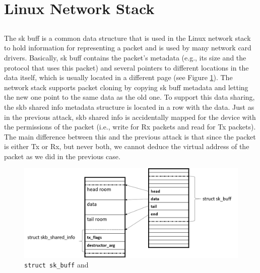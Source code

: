 \section{Linux Network Stack}

\subsection{\shinfo}
The sk buff is a common data structure that is used in the Linux network stack to
hold information for representing a packet and is used by many network card drivers.
Basically, sk buff contains the packet’s metadata (e.g., its size and the protocol that
uses this packet) and several pointers to different locations in the data itself, which is usually located in a different page (see Figure \ref{fig:sh_info}). The network stack supports packet
cloning by copying sk buff metadata and letting the new one point to the same data
as the old one. To support this data sharing, the skb shared info metadata structure
is located in a row with the data. Just as in the previous attack, skb shared info is
accidentally mapped for the device with the permissions of the packet (i.e., write for Rx
packets and read for Tx packets).
The main difference between this and the previous attack is that since the packet is
either Tx or Rx, but never both, we cannot deduce the virtual address of the packet as we did in the previous case.
\begin{figure}
    \centering
    \includegraphics[width=1.2\linewidth]{figs/skb.png}
    \caption{\texttt{struct sk\_buff} and \shinfo}
    \label{fig:sh_info}
\end{figure}
